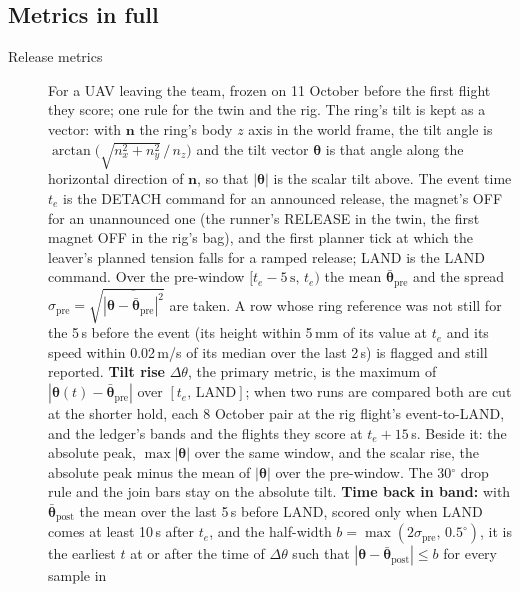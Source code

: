 \subsection{Metrics in full}
\label{sec:app_metrics}

\begin{description}
\item[Release metrics] For a UAV leaving the team, frozen on 11 October before the first flight they
    score; one rule for the twin and the rig. The ring's tilt is kept as a vector: with $\mathbf{n}$ the ring's
    body $z$ axis in the world frame, the tilt angle is $\arctan\!\big(\sqrt{n_x^2+n_y^2}\,/\,n_z\big)$ and
    the tilt vector $\boldsymbol{\theta}$ is that angle along the horizontal direction of $\mathbf{n}$, so that
    $|\boldsymbol{\theta}|$ is the scalar tilt above. The event time $t_e$ is the DETACH command for an announced
    release, the magnet's OFF for an unannounced one (the runner's RELEASE in the twin, the first magnet OFF in
    the rig's bag), and the first planner tick at which the leaver's planned tension falls for a ramped release;
    LAND is the LAND command. Over the pre-window $[t_e-5\,\mathrm{s},\,t_e)$ the mean
    $\bar{\boldsymbol{\theta}}_{\mathrm{pre}}$ and the spread
    $\sigma_{\mathrm{pre}}=\sqrt{\overline{|\boldsymbol{\theta}-\bar{\boldsymbol{\theta}}_{\mathrm{pre}}|^2}}$
    are taken. A row whose ring reference was not still for the 5\,s before the event (its height within
    5\,mm of its value at $t_e$ and its speed within 0.02\,m/s of its median over the last 2\,s) is flagged and
    still reported. \textbf{Tilt rise} $\Delta\theta$, the primary metric, is the maximum of
    $|\boldsymbol{\theta}(t)-\bar{\boldsymbol{\theta}}_{\mathrm{pre}}|$ over $[t_e,\,\mathrm{LAND}]$; when two
    runs are compared both are cut at the shorter hold, each 8 October pair at the rig flight's event-to-LAND,
    and the ledger's bands and the flights they score at $t_e+15$\,s. Beside it: the absolute peak,
    $\max|\boldsymbol{\theta}|$ over the same window, and the scalar rise, the absolute peak minus the mean of
    $|\boldsymbol{\theta}|$ over the pre-window. The 30$^\circ$ drop rule and the join bars stay on the
    absolute tilt. \textbf{Time back in band:} with $\bar{\boldsymbol{\theta}}_{\mathrm{post}}$ the mean over
    the last 5\,s before LAND, scored only when LAND comes at least 10\,s after $t_e$, and the half-width
    $b=\max(2\sigma_{\mathrm{pre}},\,0.5^\circ)$, it is the earliest $t$ at or after the time of $\Delta\theta$
    such that $|\boldsymbol{\theta}-\bar{\boldsymbol{\theta}}_{\mathrm{post}}|\le b$ for every sample in

\end{description}
